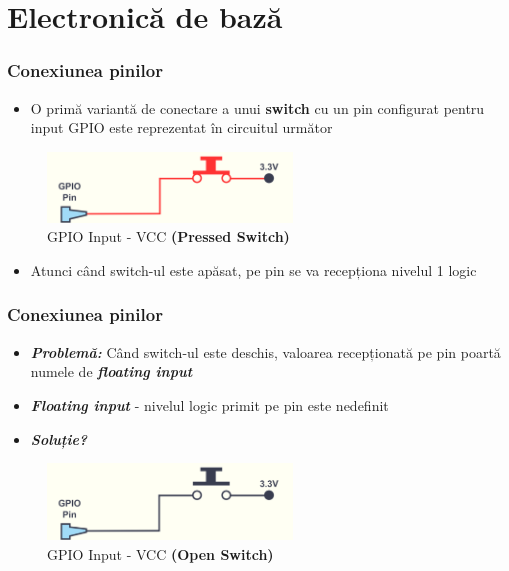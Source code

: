 \documentclass[xcolor={table}]{beamer}
\begin{document}
	\section{Electronică de bază}
	\begin{frame}
	    \frametitle{Conexiunea pinilor}
	    \begin{itemize}
	        \item O primă variantă de conectare a unui \textbf{switch} cu un pin configurat pentru input GPIO este reprezentat în circuitul următor
	    \end{itemize}
	    \begin{figure}
	        \centering
	        \includegraphics[width=6.5cm]{images/gpio1-onlyvcc-pressed.png}
	        \caption{GPIO Input - VCC \textbf{(Pressed Switch)}}
	        \label{fig:my_label}
	    \end{figure}
	    \begin{itemize}
	        \item Atunci când switch-ul este apăsat, pe pin se va recepționa nivelul 1 logic
	    \end{itemize}
	\end{frame}
		\begin{frame}
	    \frametitle{Conexiunea pinilor}
	    \begin{itemize}
	        \item \textbf{\textit{\color{red}Problemă: }} Când switch-ul este deschis, valoarea recepționată pe pin poartă numele de \textbf{\textit{floating input}}
	        \item \textbf{\textit{Floating input }} - nivelul logic primit pe pin este nedefinit
	        \item \textbf{\textit{Soluție?}}
	    \end{itemize}
	    \begin{figure}
	        \centering
	        \includegraphics[width=6.5cm]{images/gpio1-onlyvcc-open.png}
	        \caption{GPIO Input - VCC \textbf{(Open Switch)}}
	        \label{fig:my_label}
	    \end{figure}
	\end{frame}
\end{document}
